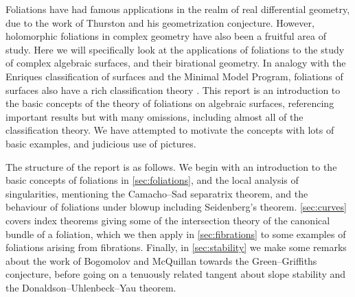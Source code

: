Foliations have had famous applications in the realm of real differential
geometry, due to the work of Thurston and his geometrization conjecture.
However, holomorphic foliations in complex geometry have also been a fruitful
area of study. Here we will specifically look at the applications of foliations
to the study of complex algebraic surfaces, and their birational geometry. In
analogy with the Enriques classification of surfaces and the Minimal Model
Program, foliations of surfaces also have a rich classification theory
\cite{brunella_book}. This report is an introduction to the basic concepts of
the theory of foliations on algebraic surfaces, referencing important results
but with many omissions, including almost all of the classification theory. We
have attempted to motivate the concepts with lots of basic examples, and
judicious use of pictures.

The structure of the report is as follows. We begin with an introduction to the
basic concepts of foliations in \cref{sec:foliations}, and the local analysis of
singularities, mentioning the Camacho--Sad separatrix theorem, and the behaviour
of foliations under blowup including Seidenberg's theorem. \cref{sec:curves}
covers index theorems giving some of the intersection theory of the canonical
bundle of a foliation, which we then apply in \cref{sec:fibrations} to some
examples of foliations arising from fibrations. Finally, in \cref{sec:stability}
we make some remarks about the work of Bogomolov and McQuillan towards the
Green--Griffiths conjecture, before going on a tenuously related tangent about
slope stability and the Donaldson--Uhlenbeck--Yau theorem.
